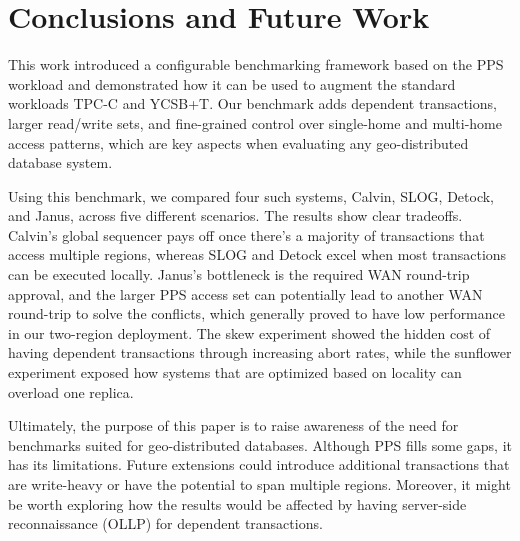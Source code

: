 \section{Conclusions and Future Work}
\label{sec: conclusion-and-future-work}

This work introduced a configurable benchmarking framework based on the PPS workload and demonstrated how it can be used to augment the standard workloads TPC-C and YCSB+T. Our benchmark adds dependent transactions, larger read/write sets, and fine-grained control over single-home and multi-home access patterns, which are key aspects when evaluating any geo-distributed database system. 

Using this benchmark, we compared four such systems, Calvin, SLOG, Detock, and Janus, across five different scenarios. The results show clear tradeoffs. Calvin's global sequencer pays off once there's a majority of transactions that access multiple regions, whereas SLOG and Detock excel when most transactions can be executed locally. Janus's bottleneck is the required WAN round-trip approval, and the larger PPS access set can potentially lead to another WAN round-trip to solve the conflicts, which generally proved to have low performance in our two-region deployment. The skew experiment showed the hidden cost of having dependent transactions through increasing abort rates, while the sunflower experiment exposed how systems that are optimized based on locality can overload one replica.

Ultimately, the purpose of this paper is to raise awareness of the need for benchmarks suited for geo-distributed databases. Although PPS fills some gaps, it has its limitations. Future extensions could introduce additional transactions that are write-heavy or have the potential to span multiple regions. Moreover, it might be worth exploring how the results would be affected by having server-side reconnaissance (OLLP) for dependent transactions.